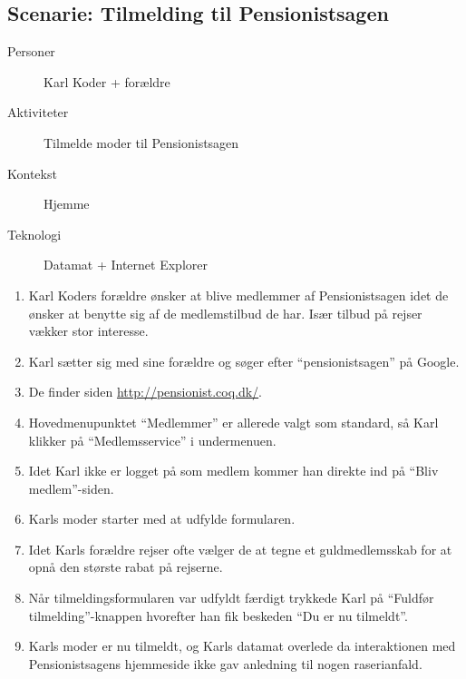 \subsection{Scenarie: Tilmelding til Pensionistsagen}

\begin{description}
    \item[Personer] Karl Koder + forældre
    \item[Aktiviteter] Tilmelde moder til Pensionistsagen
    \item[Kontekst] Hjemme
    \item[Teknologi] Datamat + Internet Explorer
\end{description}

\begin{enumerate}
    \item Karl Koders forældre ønsker at blive medlemmer af Pensionistsagen
          idet de ønsker at benytte sig af de medlemstilbud de har. Især
          tilbud på rejser vækker stor interesse.
    \item Karl sætter sig med sine forældre og søger efter
          ``pensionistsagen'' på Google.
    \item De finder siden \url{http://pensionist.coq.dk/}.
    \item Hovedmenupunktet ``Medlemmer'' er allerede valgt som standard, så
          Karl klikker på ``Medlemsservice'' i undermenuen.
    \item Idet Karl ikke er logget på som medlem kommer han direkte ind på
          ``Bliv medlem''-siden.
    \item Karls moder starter med at udfylde formularen.
    \item Idet Karls forældre rejser ofte vælger de at tegne et
          guldmedlemsskab for at opnå den største rabat på rejserne.
    \item Når tilmeldingsformularen var udfyldt færdigt trykkede Karl på
          ``Fuldfør tilmelding''-knappen hvorefter han fik beskeden ``Du er
          nu tilmeldt''.
    \item Karls moder er nu tilmeldt, og Karls datamat overlede da
          interaktionen med Pensionistsagens hjemmeside ikke gav anledning til
          nogen raserianfald.
\end{enumerate}
